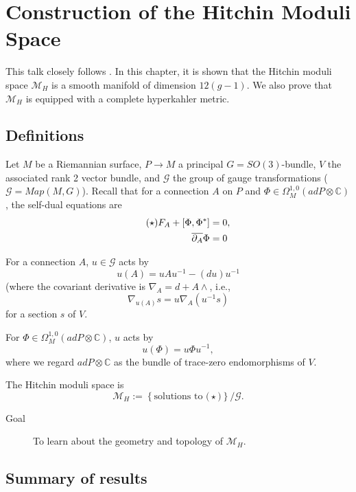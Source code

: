 \chapter{Construction of the Hitchin Moduli Space}


This talk closely follows \cite{H1}. In this chapter, it is shown
that the Hitchin moduli space $\mathcal{M}_{H}$ is a smooth manifold
of dimension $12(g-1)$. We also prove that $\mathcal{M}_{H}$ is
equipped with a complete hyperkahler metric.


\section{Definitions}

Let $M$ be a Riemannian surface, $P\rightarrow M$ a principal $G=SO\left(3\right)$-bundle,
$V$ the associated rank 2 vector bundle, and $\mathcal{G}$ the group
of gauge transformations ($\mathcal{G}=Map\left(M,G\right)$). Recall
that for a connection $A$ on $P$ and $\Phi\in\Omega_{M}^{1,0}\left(adP\otimes\mathbb{C}\right)$,
the self-dual equations are
\begin{align*}
\tag{\ensuremath{\star}}F_{A}+\left[\Phi,\Phi^{*}\right] & =0,\\
\overline{\partial_{A}}\Phi & =0
\end{align*}


For a connection $A$, $u\in\mathcal{G}$ acts by
\[
u\left(A\right)=uAu^{-1}-\left(du\right)u^{-1}
\]
(where the covariant derivative is $\nabla_{A}=d+A\wedge$, i.e.,
\[
\nabla_{u\left(A\right)}s=u\nabla_{A}\left(u^{-1}s\right)
\]
for a section $s$ of $V$.

For $\Phi\in\Omega_{M}^{1,0}\left(adP\otimes\mathbb{C}\right)$, $u$
acts by
\[
u\left(\Phi\right)=u\Phi u^{-1},
\]
where we regard $adP\otimes\mathbb{C}$ as the bundle of trace-zero
endomorphisms of $V$.
\begin{defn}
The Hitchin moduli space is
\[
\mathcal{M}_{H}:=\left\{ \mbox{solutions to (}\star\mbox{)}\right\} /\mathcal{G}.
\]
\end{defn}
\begin{description}
\item [{Goal}] To learn about the geometry and topology of $\mathcal{M}_{H}$.
\end{description}

\section{Summary of results}

